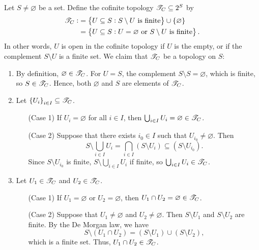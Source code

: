 \documentclass[11pt,openany]{article}
\begin{document}
\begin{example}
	Let $S\neq\varnothing$ be a set. Define the cofinite topology $\mathscr{T}_C\subseteq 2^S$ by \begin{align*}
	\topology_C:&=\set{U\subseteq S:S\setminus U\ \text{is finite}}\cup\set{\varnothing}\\
	&=\set{U\subseteq S:U=\varnothing\ \text{or}\ S\setminus U\ \text{is finite}}.
	\end{align*} In other words, $U$ is open in the cofinite topology if $U$ is the empty, or if the complement $S\setminus U$ is a finite set. We claim that $\mathscr{T}_C$ be a topology on $S$:
	\begin{enumerate}[(O1)]
		\item By definition, $\varnothing\in\mathscr{T}_C$. For $U=S$, the complement $S\setminus S=\varnothing$, which is finite, so $S\in\mathscr{T}_C$. Hence, both $\varnothing$ and $S$ are elements of $\mathscr{T}_C$.
		\item Let $\set{U_i}_{i\in I}\subseteq\mathscr{T}_C$. 
		\begin{itemize}
			\item[(Case 1)] If $U_i=\varnothing$ for all $i\in I$, then $\bigcup_{i\in I}U_i=\varnothing\in\mathscr{T}_C$. 
			\item[(Case 2)] Suppose that there exists $i_0\in I$ such that $U_{i_0}\neq\varnothing$. Then \[
			S\setminus\bigcup_{i\in I}U_i=\bigcap_{i\in I}\left(S\setminus U_i\right)\subseteq (S\setminus U_{i_0}).
			\]
			Since $S\setminus U_{i_0}$ is finite, $S\setminus\bigcup_{i\in I}U_i$ if finite, so $\bigcup_{i\in I} U_i\in\mathscr{T}_C$.
		\end{itemize}
		\item Let $U_1\in\mathscr{T}_C$ and $U_2\in\mathscr{T}_C$. 
		\begin{itemize}
			\item[(Case 1)] If $U_1=\varnothing$ or $U_2=\varnothing$, then $U_1\cap U_2=\varnothing\in\mathscr{T}_C$. 
			\item[(Case 2)] Suppose that $U_1\neq\varnothing$ and $U_2\neq\varnothing$. Then $S\setminus U_1$ and $S\setminus U_2$ are finite. By the De Morgan law, we have \[
			S\setminus(U_1\cap U_2)=(S\setminus U_1)\cup (S\setminus U_2),
			\] which is a finite set. Thus, $U_1\cap U_2\in\mathscr{T}_C$.
		\end{itemize}
	\end{enumerate}
\end{example}
\end{document}
